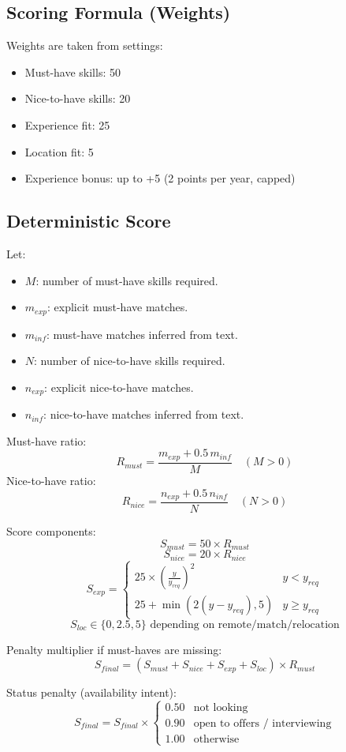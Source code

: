 \documentclass[12pt,a4paper]{article}
\begin{document}
\subsection{Scoring Formula (Weights)}
Weights are taken from settings:
\begin{itemize}
    \item Must-have skills: 50
    \item Nice-to-have skills: 20
    \item Experience fit: 25
    \item Location fit: 5
    \item Experience bonus: up to +5 (2 points per year, capped)
\end{itemize}

\subsection{Deterministic Score}
Let:
\begin{itemize}
    \item $M$: number of must-have skills required.
    \item $m_{exp}$: explicit must-have matches.
    \item $m_{inf}$: must-have matches inferred from text.
    \item $N$: number of nice-to-have skills required.
    \item $n_{exp}$: explicit nice-to-have matches.
    \item $n_{inf}$: nice-to-have matches inferred from text.
\end{itemize}

\noindent Must-have ratio:
\[
R_{must} = \frac{m_{exp} + 0.5\,m_{inf}}{M} \quad (M>0)
\]
\noindent Nice-to-have ratio:
\[
R_{nice} = \frac{n_{exp} + 0.5\,n_{inf}}{N} \quad (N>0)
\]

\noindent Score components:
\[
S_{must} = 50 \times R_{must}
\]
\[
S_{nice} = 20 \times R_{nice}
\]
\[
S_{exp} =
\begin{cases}
25 \times (\frac{y}{y_{req}})^2 & y < y_{req} \\
25 + \min(2(y - y_{req}), 5) & y \ge y_{req}
\end{cases}
\]
\[
S_{loc} \in \{0, 2.5, 5\} \text{ depending on remote/match/relocation}
\]

\noindent Penalty multiplier if must-haves are missing:
\[
S_{final} = (S_{must}+S_{nice}+S_{exp}+S_{loc}) \times R_{must}
\]

\noindent Status penalty (availability intent):
\[
S_{final} = S_{final} \times \begin{cases}
0.50 & \text{not looking} \\
0.90 & \text{open to offers / interviewing} \\
1.00 & \text{otherwise}
\end{cases}
\]
\end{document}
